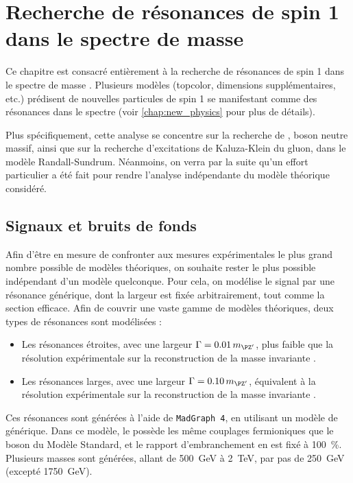 \chapter{Recherche de résonances de spin 1 dans le spectre de masse \ttbar} \label{chap:zprime}

Ce chapitre est consacré entièrement à la recherche de résonances de spin 1 dans le spectre de masse \ttbar. Plusieurs modèles (topcolor, dimensions supplémentaires, etc.) prédisent de nouvelles particules de spin 1 se manifestant comme des résonances dans le spectre \mtt (voir \cref{chap:new_physics} pour plus de détails).

\bigskip

Plus spécifiquement, cette analyse se concentre sur la recherche de \zprime, boson neutre massif, ainsi que sur la recherche d'excitations de Kaluza-Klein du gluon, dans le modèle Randall-Sundrum. Néanmoins, on verra par la suite qu'un effort particulier a été fait pour rendre l'analyse indépendante du modèle théorique considéré.

\section{Signaux et bruits de fonds}

Afin d'être en mesure de confronter aux mesures expérimentales le plus grand nombre possible de modèles théoriques, on souhaite rester le plus possible indépendant d'un modèle quelconque. Pour cela, on modélise le signal par une résonance générique, dont la largeur est fixée arbitrairement, tout comme la section efficace. Afin de couvrir une vaste gamme de modèles théoriques, deux types de résonances sont modélisées :
\begin{itemize}
    \item Les résonances étroites, avec une largeur $\Gamma = \num{0.01} \, \mzp$, plus faible que la résolution expérimentale sur la reconstruction de la masse invariante \ttbar.
    \item Les résonances larges, avec une largeur $\Gamma = \num{0.10} \, \mzp$, équivalent à la résolution expérimentale sur la reconstruction de la masse invariante \ttbar.
\end{itemize}

Ces résonances sont générées à l'aide de \texttt{MadGraph 4}, en utilisant un modèle de \zprime générique. Dans ce modèle, le \zprime possède les même couplages fermioniques que le boson \PZ du Modèle Standard, et le rapport d'embranchement en \ttbar est fixé à \SI{100}{\%}. Plusieurs masses sont générées, allant de \SI{500}{\GeV} à \SI{2}{\TeV}, par pas de \SI{250}{\GeV} (excepté \SI{1750}{\GeV}).

